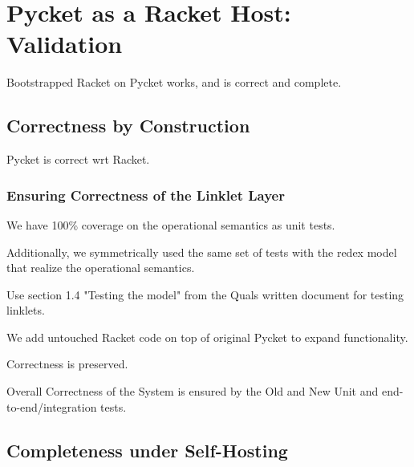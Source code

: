 \chapter{Pycket as a Racket Host: Validation}

	\begin{chaptersynopsis}
		Bootstrapped Racket on Pycket works, and is correct and complete.
	\end{chaptersynopsis}


	\section{Correctness by Construction}

		\begin{mainpoint}
			Pycket is correct wrt Racket.
		\end{mainpoint}

		\subsection{Ensuring Correctness of the Linklet Layer}
			\begin{mainpoint}
				We have 100\% coverage on the operational semantics as unit tests.

				Additionally, we symmetrically used the same set of tests with the redex model that realize the operational semantics.
			\end{mainpoint}

			\begin{todo}[Import]
				Use section 1.4 "Testing the model" from the Quals written document for testing linklets.
			\end{todo}

		\begin{paragraph-here}
			We add untouched Racket code on top of original Pycket to expand functionality.

				Correctness is preserved.
		\end{paragraph-here}

		\begin{paragraph-here}
			Overall Correctness of the System is ensured by the Old and New Unit and end-to-end/integration tests.
		\end{paragraph-here}

	\section{Completeness under Self-Hosting}


